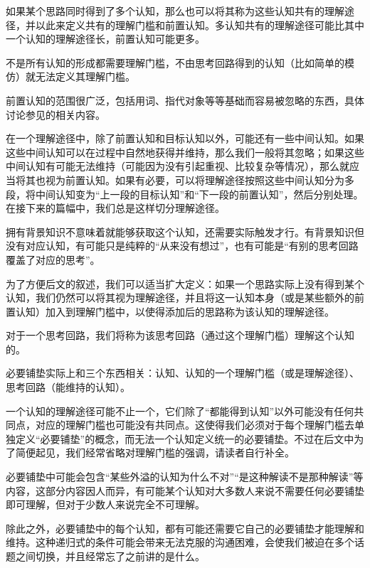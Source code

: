 \begin{explain}
如果某个思路同时得到了多个认知，那么也可以将其称为这些认知共有的理解途径，并以此来定义共有的理解门槛和前置认知。多认知共有的理解途径可能比其中一个认知的理解途径长，前置认知可能更多。

不是所有认知的形成都需要理解门槛，不由思考回路得到的认知（比如简单的模仿）就无法定义其理解门槛。

前置认知的范围很广泛，包括用词、指代对象等等基础而容易被忽略的东西，具体讨论参见的相关内容。

在一个理解途径中，除了前置认知和目标认知以外，可能还有一些中间认知。如果这些中间认知可以在过程中自然地获得并维持，那么我们一般将其忽略；如果这些中间认知有可能无法维持（可能因为没有引起重视、比较复杂等情况），那么就应当将其也视为前置认知。如果有必要，可以将理解途径按照这些中间认知分为多段，将中间认知变为“上一段的目标认知”和“下一段的前置认知”，然后分别处理。在接下来的篇幅中，我们总是这样切分理解途径。

拥有背景知识不意味着就能够获取这个认知，还需要实际触发才行。有背景知识但没有对应认知，有可能只是纯粹的“从来没有想过”，也有可能是“有别的思考回路覆盖了对应的思考”。

为了方便后文的叙述，我们可以适当扩大定义：如果一个思路实际上没有得到某个认知，我们仍然可以将其视为理解途径，并且将这一认知本身（或是某些额外的前置认知）加入到理解门槛中，以使得添加后的思路称为该认知的理解途径。
\end{explain}
对于一个思考回路，我们将称为该思考回路（通过这个理解门槛）理解这个认知的。
\begin{explain}
必要铺垫实际上和三个东西相关：认知、认知的一个理解门槛（或是理解途径）、思考回路（能维持的认知）。

一个认知的理解途径可能不止一个，它们除了“都能得到认知”以外可能没有任何共同点，对应的理解门槛也可能没有共同点。这使得我们必须对于每个理解门槛去单独定义“必要铺垫”的概念，而无法一个认知定义统一的必要铺垫。不过在后文中为了简便起见，我们经常省略对理解门槛的强调，请读者自行补全。

必要铺垫中可能会包含“某些外溢的认知为什么不对”“是这种解读不是那种解读”等内容，这部分内容因人而异，有可能某个认知对大多数人来说不需要任何必要铺垫即可理解，但对于少数人来说完全不可理解。

除此之外，必要铺垫中的每个认知，都有可能还需要它自己的必要铺垫才能理解和维持。这种递归式的条件可能会带来无法克服的沟通困难，会使我们被迫在多个话题之间切换，并且经常忘了之前讲的是什么。
\end{explain}
